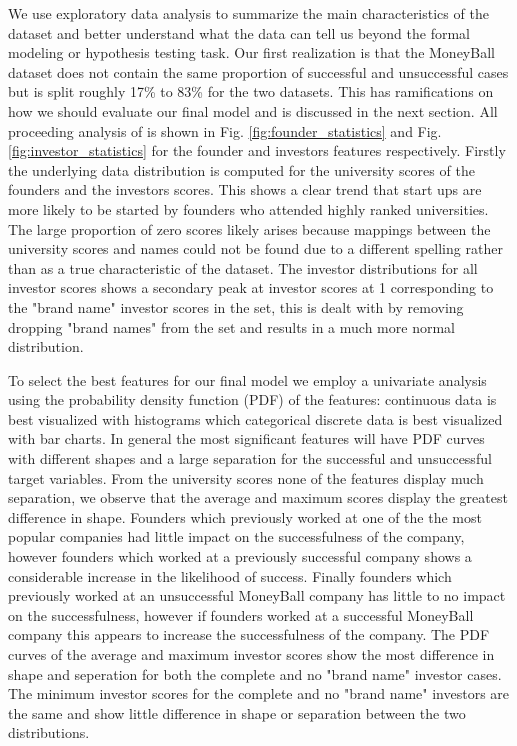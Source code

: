 \documentclass{article}
\begin{document}
We use exploratory data analysis to summarize the main characteristics of the dataset and better understand what the data can tell us beyond the formal modeling or hypothesis testing task. Our first realization is that the MoneyBall dataset does not contain the same proportion of successful and unsuccessful cases but is split roughly 17\% to 83\% for the two datasets. This has ramifications on how we should evaluate our final model and is discussed in the next section. All proceeding analysis of is shown in Fig. \ref{fig:founder_statistics} and Fig. \ref{fig:investor_statistics} for the founder and investors features respectively. Firstly the underlying data distribution is computed for the university scores of the founders and the investors scores. This shows a clear trend that start ups are more likely to be started by founders who attended highly ranked universities. The large proportion of zero scores likely arises because mappings between the university scores and names could not be found due to a different spelling rather than as a true characteristic of the dataset. The investor distributions for all investor scores shows a secondary peak at investor scores at 1 corresponding to the "brand name" investor scores in the set, this is dealt with by removing dropping "brand names" from the set and results in a much more normal distribution.

To select the best features for our final model we employ a univariate analysis using the probability density function (PDF) of the features: continuous data is best visualized with histograms which categorical discrete data is best visualized with bar charts. In general the most significant features will have PDF curves with different shapes and a large separation for the successful and unsuccessful target variables. From the university scores none of the features display much separation, we observe that the average and maximum scores display the greatest difference in shape. Founders which previously worked at one of the the most popular companies had little impact on the successfulness of the company, however founders which worked at a previously successful company shows a considerable increase in the likelihood of success. Finally founders which previously worked at an unsuccessful MoneyBall company has little to no impact on the successfulness, however if founders worked at a successful MoneyBall company this appears to increase the successfulness of the company. The PDF curves of the average and maximum investor scores show the most difference in shape and seperation for both the complete and no "brand name" investor cases. The minimum investor scores for the complete and no "brand name" investors are the same and show little difference in shape or separation between the two distributions.
\end{document}
